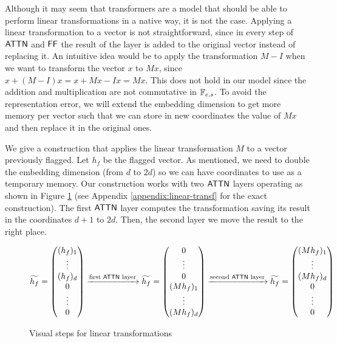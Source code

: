 Although it may seem that transformers are a model that should be able to perform linear transformations in a native way, it is not the case.
Applying a linear transformation to a vector is not straightforward, since in every step of $\mathsf{ATTN}$ and $\mathsf{FF}$ the result of the layer is added to the original vector instead of replacing it.
An intuitive idea would be to apply the transformation $M-I$ when we want to transform the vector $x$ to $Mx$, since $x + (M-I)x = x + Mx - Ix = Mx$.
This does not hold in our model since the addition and multiplication are not commutative in $\mathbb{F}_{e,s}$.
To avoid the representation error, we will extend the embedding dimension to get more memory per vector such that we can store in new coordinates the value of $Mx$ and then replace it in the original ones.

\bigskip

We give a construction that applies the linear transformation $M$ to a vector previously flagged.
Let $h_f$ be the flagged vector.
As mentioned, we need to double the embedding dimension (from $d$ to $2d$) so we can have coordinates to use as a temporary memory.
Our construction works with two $\mathsf{ATTN}$ layers operating as shown in Figure \ref{fig:steps-linear-tranf} (see Appendix \ref{appendix:linear-transf} for the exact construction).
The first $\mathsf{ATTN}$ layer computes the transformation saving its result in the coordinates $d+1$ to $2d$.
Then, the second layer we move the result to the right place.

\begin{figure}[h]
    \centering    
    \[
        \widetilde{h_f} = \left( \begin{matrix} (h_f)_1    \\ \vdots \\ (h_f)_d    \\ 0      \\ \vdots \\ 0       \end{matrix} \right) 
        \xrightarrow{\text{first $\mathsf{ATTN}$ layer}}
        \widetilde{h_f} = \left( \begin{matrix} 0      \\ \vdots \\ 0      \\ (Mh_f)_1 \\ \vdots \\ (Mh_f)_d \end{matrix} \right)
        \xrightarrow{\text{second $\mathsf{ATTN}$ layer}}
        \widetilde{h_f} = \left( \begin{matrix} (Mh_f)_1 \\ \vdots \\ (Mh_f)_d \\ 0      \\ \vdots \\ 0      \end{matrix} \right)
    \]
    \caption{Visual steps for linear transformations}\label{fig:steps-linear-tranf}
\end{figure}